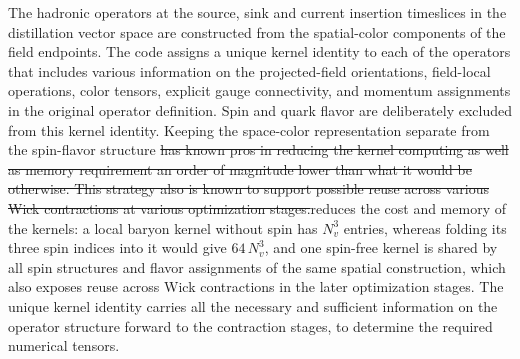 \documentclass[a4paper,fleqn]{cas-dc}
\newcommand{\del}[1]{{\color{red}\sout{#1}}}
\newcommand{\add}[1]{{\color{blue}#1}}
\begin{document}
The hadronic operators at the source, sink and current insertion timeslices in the distillation vector space are constructed from the spatial-color components of the field endpoints. The code assigns a unique kernel identity to each of the operators that includes various information on the projected-field orientations, field-local operations, color tensors, explicit gauge connectivity, and momentum assignments in the original operator definition. Spin and quark flavor are deliberately excluded from this kernel identity. Keeping the space-color representation \add{separate} from the spin-flavor structure \del{has known pros in reducing the kernel computing as well as memory requirement an order of magnitude lower than what it would be otherwise. This strategy also is known to support possible reuse across various Wick contractions at various optimization stages.}\add{reduces the cost and memory of the kernels: a local baryon kernel without spin has $N_v^3$ entries, whereas folding its three spin indices into it would give $64\,N_v^3$, and one spin-free kernel is shared by all spin structures and flavor assignments of the same spatial construction, which also exposes reuse across Wick contractions in the later optimization stages.} The unique kernel identity carries all the necessary and sufficient information on the operator structure forward to the contraction stages, to determine the required numerical tensors. 
\end{document}
